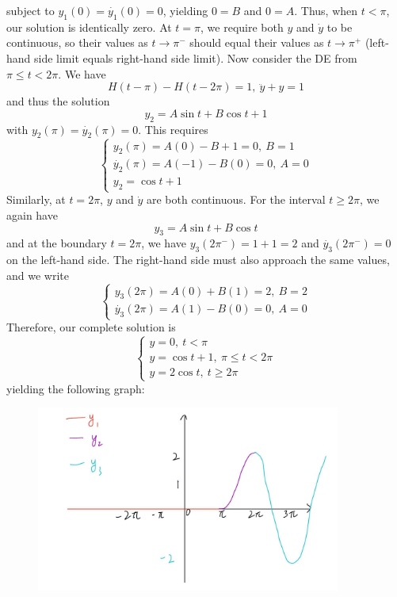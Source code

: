 \documentclass{article}
\begin{document}
subject to $y_1(0) = \dot{y_1}(0)=0$, yielding $0=B$ and $0=A$. Thus, when $t<\pi$, our solution is identically zero. At $t=\pi$, we require both $y$ and $\dot{y}$ to be continuous, so their values as $t \to \pi^-$ should equal their values as $t \to \pi^+$ (left-hand side limit equals right-hand side limit). Now consider the DE from $\pi \leq t < 2\pi$. We have 
\begin{equation*}
    H(t-\pi)-H(t-2\pi) = 1,\ \ddot{y}+y=1
\end{equation*}
and thus the solution 
\begin{equation*}
    y_2=A \sin t + B \cos t+1
\end{equation*}
with $y_2(\pi)=\dot{y_2}(\pi)=0$. This requires 
\begin{equation*}
    \begin{cases}
        y_2(\pi)=A(0)-B+1=0,\ B = 1 \\
        \dot{y_2}(\pi)=A(-1)-B(0)=0,\ A = 0 \\
        y_2 = \cos t + 1
    \end{cases}
\end{equation*}
Similarly, at $t = 2\pi$, $y$ and $\dot{y}$ are both continuous. For the interval $t \geq 2\pi$, we again have 
\begin{equation*}
    y_3=A\sin t + B\cos t
\end{equation*}
and at the boundary $t=2\pi$, we have $y_3(2\pi^-)=1+1=2$ and $\dot{y_3}(2\pi^-)=0$ on the left-hand side. The right-hand side must also approach the same values, and we write 
\begin{equation*}
    \begin{cases}
        y_3(2\pi)=A(0)+B(1)=2,\ B = 2 \\
        \dot{y_3}(2\pi) = A(1)-B(0)=0,\ A = 0
    \end{cases}
\end{equation*}
Therefore, our complete solution is 
\begin{equation*}
    \begin{cases}
        y = 0,\ t < \pi \\
        y = \cos t + 1,\ \pi \leq t < 2\pi \\
        y = 2\cos t,\ t\geq 2\pi
    \end{cases}
\end{equation*}
yielding the following graph:
\begin{figure}[h]
    \centering
    \includegraphics[width=10cm]{DE-ch3-10.jpg}
\end{figure}
\end{document}
